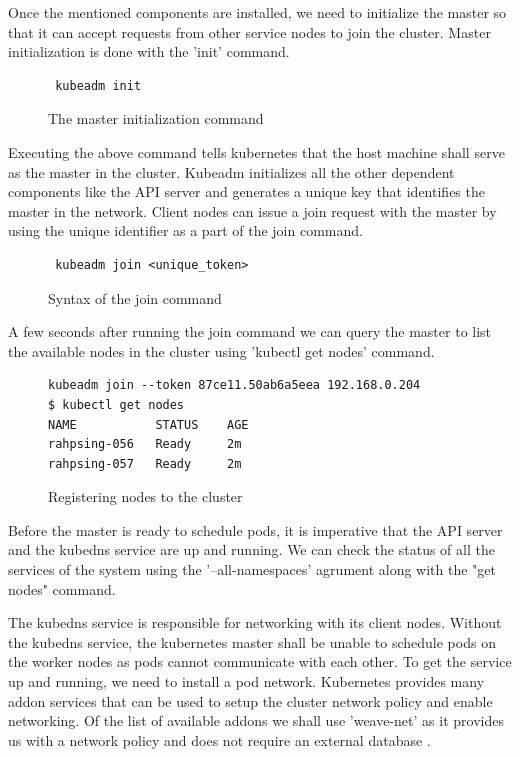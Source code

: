 \documentclass[9pt,twocolumn,twoside]{../../styles/osajnl}
\begin{document}
Once the mentioned components are installed, we need to initialize the
master so that it can accept requests from other service nodes to join
the cluster. Master initialization is done with the 'init' command.

\begin{figure}[H]
\begin{verbatim}
 kubeadm init
\end{verbatim}
\caption{The master initialization command}
\label{The master initialization command}
\end{figure}

Executing the above command tells kubernetes that the host machine
shall serve as the master in the cluster. Kubeadm initializes all the
other dependent components like the API server and generates a unique
key that identifies the master in the network. Client nodes can issue
a join request with the master by using the unique identifier as a
part of the join command.

\begin{figure}[H]
\begin{verbatim}
 kubeadm join <unique_token>
\end{verbatim}
\caption{Syntax of the join command}
\label{Syntax of the join command}
\end{figure}

A few seconds after running the join command we can query the master
to list the available nodes in the cluster using 'kubectl get nodes' command.

\begin{figure}[H]
\begin{verbatim}
kubeadm join --token 87ce11.50ab6a5eea 192.168.0.204
$ kubectl get nodes
NAME           STATUS    AGE
rahpsing-056   Ready     2m
rahpsing-057   Ready     2m
\end{verbatim}
\caption{Registering nodes to the cluster}
\label{Registering nodes to the cluster}
\end{figure}

Before the master is ready to schedule pods, it is imperative that the
API server and the kubedns service are up and running. We can check
the status of all the services of the system using the
'--all-namespaces' agrument along with the "get nodes" command.

The kubedns service is responsible for networking with its client
nodes. Without the kubedns service, the kubernetes master shall be
unable to schedule pods on the worker nodes as pods cannot communicate
with each other. To get the service up and running, we need to install
a pod network.  Kubernetes provides many addon services that can be
used to setup the cluster network policy and enable networking. Of the
list of available addons we shall use 'weave-net' as it provides us
with a network policy and does not require an external database
\cite{www-kubernetes-addons}.
\end{document}
